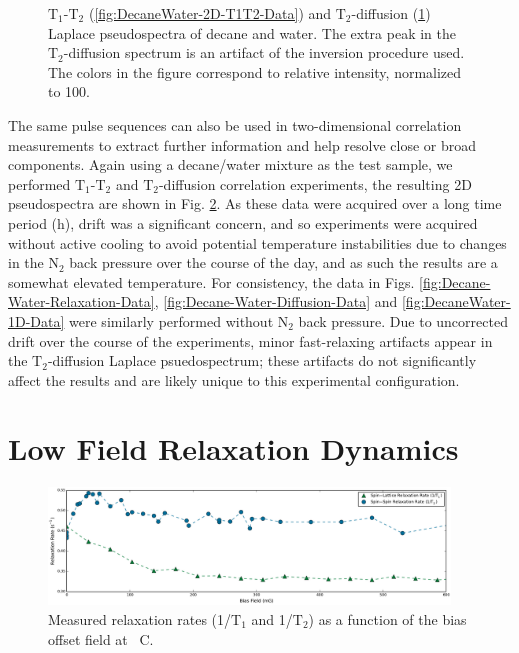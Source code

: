 \documentclass[PaulGanssle-Thesis.tex]{subfiles}
\begin{document}
\begin{figure}[h]
\begin{subfigure}[t]{0.495\textwidth}
    \caption{}  
    \label{fig:DecaneWater-2D-T2D-Data}
    \end{subfigure}
    \caption{$\mathrm{T}_{1}$-$\mathrm{T}_{2}$ (\ref{fig:DecaneWater-2D-T1T2-Data}) and $\mathrm{T}_{2}$-diffusion (\ref{fig:DecaneWater-2D-T2D-Data}) Laplace pseudospectra of decane and water. The extra peak in the $\mathrm{T}_{2}$-diffusion spectrum is an artifact of the inversion procedure used. The colors in the figure correspond to relative intensity, normalized to 100.}
    \label{fig:DecaneWater-2D-Data}
\end{figure}

The same pulse sequences can also be used in two-dimensional correlation measurements to extract further information and help resolve close or broad components. Again using a decane/water mixture as the test sample, we performed $\mathrm{T}_{1}$-$\mathrm{T}_{2}$ and $\mathrm{T}_{2}$-diffusion correlation experiments, the resulting 2D pseudospectra are shown in Fig. \ref{fig:DecaneWater-2D-Data}.  As these data were acquired over a long time period (\unit[12-36]{h}), drift was a significant concern, and so experiments were acquired without active cooling to avoid potential temperature instabilities due to changes in the N$_2$ back pressure over the course of the day, and as such the results are a somewhat elevated temperature. For consistency, the data in Figs. \ref{fig:Decane-Water-Relaxation-Data}, \ref{fig:Decane-Water-Diffusion-Data} and \ref{fig:DecaneWater-1D-Data} were similarly performed without N$_2$ back pressure. Due to uncorrected drift over the course of the experiments, minor fast-relaxing artifacts appear in the $\mathrm{T}_{2}$-diffusion Laplace psuedospectrum; these artifacts do not significantly affect the results and are likely unique to this experimental configuration.

\section{Low Field Relaxation Dynamics}
\label{relaxometry.dynamics}
\begin{figure}[ht!!]
\centering
    \includegraphics[width=0.95\textwidth]{figures/relaxometry/water-relaxation-t1t2.pdf}
    \caption{Measured relaxation rates (1/$\mathrm{T}_{1}$ and 1/$\mathrm{T}_{2}$) as a function of the bias offset field at \unit[36]{\degsym C}.}
    \label{fig:LowFieldRelaxation-WaterT1T2-Data}
\end{figure}
\end{document}
